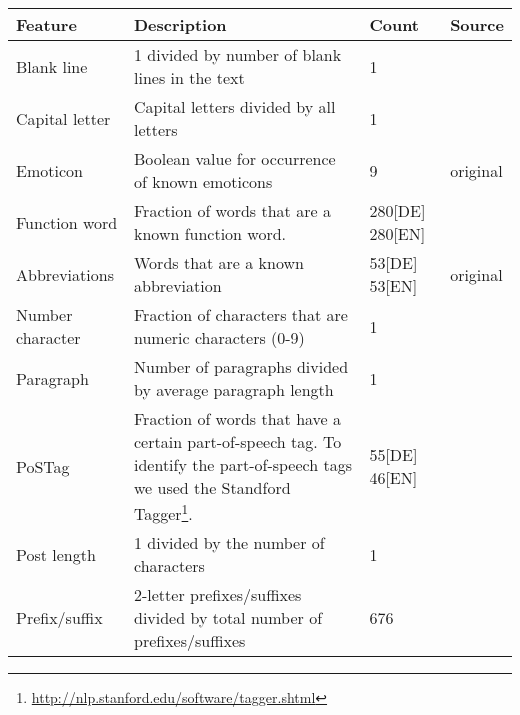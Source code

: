 \begin{savenotes}
\begin{table}[ht!]
    \begin{center}
    \begin{tabular}{p{2.6cm}|p{6cm}|p{1.2cm}|p{1.2cm}}
    Feature                 & Description                                                               & Count             & Source\\ \hline \hline
    Blank line               & 1 divided by number of blank lines in the text                            & 1                 & \cite{de2001mining}\\ \hline
    Capital letter           & Capital letters divided by all letters                                    & 1                 & \cite{argamon2003style} \cite{de2001mining}\\ \hline
    Emoticon                & Boolean value for occurrence of known emoticons                           & 9                 & original\\ \hline
    Function word            & Fraction of words that are a known function word.                         & 280[DE] 280[EN]   & \cite{argamon2003style} \cite{de2001mining} \cite{madigan2005author} \cite{narayanan2012feasibility}\\ \hline
    Abbreviations           & Words that are a known abbreviation                                       & 53[DE] 53[EN]     & original\\ \hline
    Number character         & Fraction of characters that are numeric characters (0-9)                  & 1                 & \cite{narayanan2012feasibility}\\ \hline
    Paragraph               & Number of paragraphs divided by average paragraph length                  & 1                 & \cite{argamon2003style}\\ \hline
    PoSTag                  & Fraction of words that have a certain part-of-speech tag. To identify the part-of-speech tags we used the Standford Tagger\footnote{\url{http://nlp.stanford.edu/software/tagger.shtml}}.
                                                                                                        & 55[DE] 46[EN]     & \cite{madigan2005author}\\ \hline
    Post length              & 1 divided by the number of characters                                     & 1                 & \cite{narayanan2012feasibility}\\ \hline
    Prefix/suffix            & 2-letter prefixes/suffixes divided by total number of prefixes/suffixes   & 676               & \cite{madigan2005author}\\ \hline

\end{tabular}
\end{center}
\end{table}
\end{savenotes}
